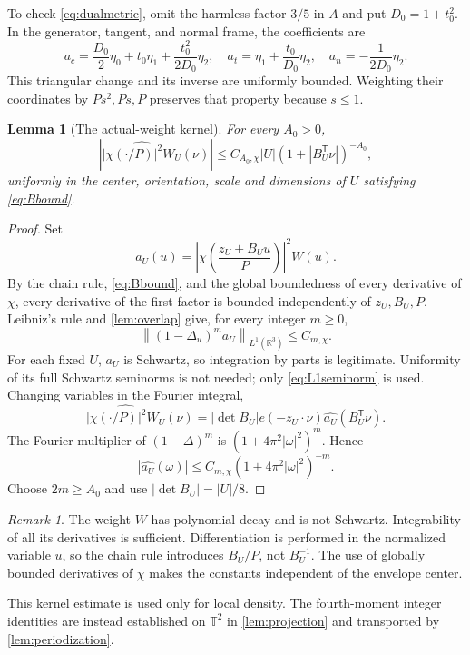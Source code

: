 \documentclass[11pt,reqno]{amsart}
\numberwithin{equation}{section}
\newtheorem{lemma}[lemma]{Lemma}
\theoremstyle{definition}
\theoremstyle{remark}
\newtheorem{remark}[remark]{Remark}
\newcommand{\R}{\mathbb R}
\newcommand{\T}{\mathbb T}
\newcommand{\norm}[1]{\left\lVert#1\right\rVert}
\begin{document}
To check \eqref{eq:dualmetric}, omit the harmless factor $3/5$ in $A$ and put $D_0=1+t_0^2$.
In the generator, tangent, and normal frame, the coefficients are
\[
 a_c=\frac{D_0}{2}\eta_0+t_0\eta_1+\frac{t_0^2}{2D_0}\eta_2,
 \quad a_t=\eta_1+\frac{t_0}{D_0}\eta_2,
 \quad a_n=-\frac1{2D_0}\eta_2.
\]
This triangular change and its inverse are uniformly bounded.
Weighting their coordinates by $Ps^2,Ps,P$ preserves that property because $s\le1$.

\begin{lemma}[The actual-weight kernel]\label{lem:kernel}
For every $A_0>0$,
\begin{equation}\label{eq:kernel}
 \left|\widehat{|\chi(\cdot/P)|^2W_U}(\nu)\right|
 \le C_{A_0,\chi}|U|(1+|B_U^{\mathsf T}\nu|)^{-A_0},
\end{equation}
uniformly in the center, orientation, scale and dimensions of $U$ satisfying \eqref{eq:Bbound}.
\end{lemma}
\begin{proof}
Set
\[
 a_U(u)=\left|\chi\left(\frac{z_U+B_Uu}{P}\right)\right|^2W(u).
\]
By the chain rule, \eqref{eq:Bbound}, and the global boundedness of every derivative of $\chi$, every derivative of the first factor is bounded independently of $z_U,B_U,P$.
Leibniz's rule and \cref{lem:overlap} give, for every integer $m\ge0$,
\begin{equation}\label{eq:L1seminorm}
 \norm{(1-\Delta_u)^m a_U}_{L^1(\R^3)}\le C_{m,\chi}.
\end{equation}
For each fixed $U$, $a_U$ is Schwartz, so integration by parts is legitimate. Uniformity of its full Schwartz seminorms is not needed; only \eqref{eq:L1seminorm} is used.
Changing variables in the Fourier integral,
\[
 \widehat{|\chi(\cdot/P)|^2W_U}(\nu)
 =|\det B_U|e(-z_U\cdot\nu)\widehat{a_U}(B_U^{\mathsf T}\nu).
\]
The Fourier multiplier of $(1-\Delta)^m$ is $(1+4\pi^2|\omega|^2)^m$. Hence
\[
 |\widehat{a_U}(\omega)|\le C_{m,\chi}(1+4\pi^2|\omega|^2)^{-m}.
\]
Choose $2m\ge A_0$ and use $|\det B_U|=|U|/8$.
\end{proof}

\begin{remark}
The weight $W$ has polynomial decay and is not Schwartz. Integrability of all its derivatives is sufficient.
Differentiation is performed in the normalized variable $u$, so the chain rule introduces $B_U/P$, not $B_U^{-1}$. The use of globally bounded derivatives of $\chi$ makes the constants independent of the envelope center.
\end{remark}
This kernel estimate is used only for local density. The fourth-moment integer identities are instead established on $\T^2$ in \cref{lem:projection} and transported by \cref{lem:periodization}.
\end{document}
